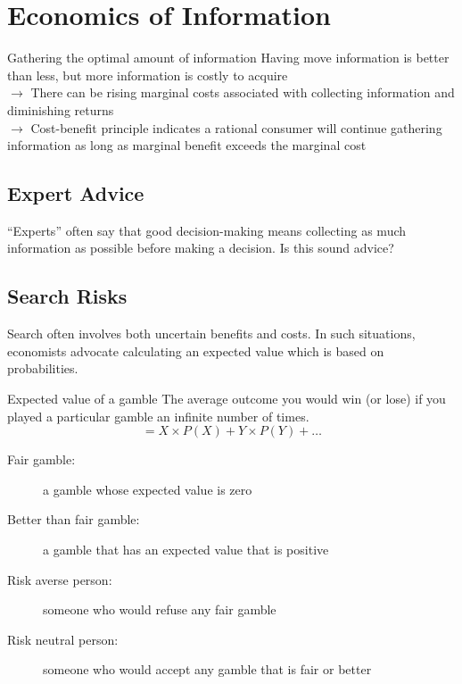 \section{Economics of Information}
\begin{note}{Gathering the optimal amount of information}
	Having move information is better than less, but more information is costly to acquire\\
	$\rightarrow$ There can be rising marginal costs associated with collecting information and diminishing returns\\
	$\rightarrow$ Cost-benefit principle indicates a rational consumer will continue gathering information as long as marginal benefit exceeds the marginal cost
\end{note}

\subsection{Expert Advice}
``Experts'' often say that good decision-making means collecting as much information as possible before making a decision. Is this sound advice?

\subsection{Search Risks}
Search often involves both uncertain benefits and costs. In such situations, economists advocate calculating an expected value which is based on probabilities.

\begin{note}{Expected value of a gamble}
	The average outcome you would win (or lose) if you played a particular gamble an infinite number of times.$$=X\times P(X)+Y\times P(Y)+\ldots$$
\end{note}

\begin{description}
	\item[Fair gamble:] a gamble whose expected value is zero
	\item[Better than fair gamble:] a gamble that has an expected value that is positive
	\item[Risk averse person:] someone who would refuse any fair gamble
	\item[Risk neutral person:] someone who would accept any gamble that is fair or better
\end{description}
\newpage
